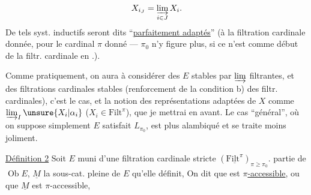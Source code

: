 \[
X_{i_J}=\varinjlim_{i\in J}X_i.
\]
De tels syst. inductifs seront dits ``\uline{parfaitement adaptés}'' (à la filtration cardinale donnée, pour le cardinal $\pi$ donné --- $\pi_0$ n'y figure plus, si ce n'est comme début de la filtr. cardinale en .).

Comme pratiquement, on aura à considérer des $E$ stables par  $\varinjlim$ filtrantes, et des filtrations cardinales stables   (renforcement de la condition b) des filtr. cardinales), c'est le cas,  et la notion des représentations  adaptées de $X$ comme $\varinjlim_I\unsure{X_i|\alpha_i}$ ($X_i\in\mathrm{Filt}^{\pi}$), que je mettrai en avant. Le cas ``général'', où on suppose simplement $E$ satisfait $L_{\pi_0}$, est plus alambiqué et se traite moins joliment.

\uline{Définition 2} Soit $E$ muni d'une filtration cardinale stricte $(\underline{\mathrm{Filt}^{\pi}})_{\pi\geq\pi_0}$.   partie  de $\operatorname{Ob}E$, $\underline M$ la sous-cat. pleine de $E$ qu'elle définit,  On dit que  est \uline{$\pi$-accessible}, ou que $\underline M$ est $\pi$-accessible,
